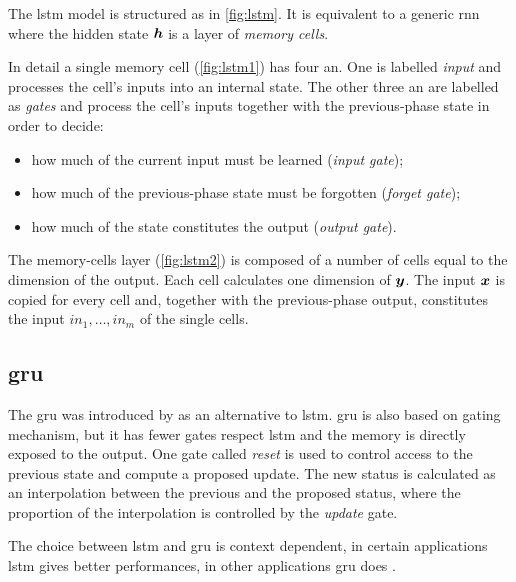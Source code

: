 The \ac{lstm} model is structured as in \cref{fig:lstm}. It is
equivalent to a
generic \ac{rnn} where the hidden state $\bm{h}$ is a
layer of \emph{memory cells}.

In detail a single
memory cell (\cref{fig:lstm1}) has four \acf{an}. One is labelled \emph{input}
and processes the cell's 
inputs into an internal state. The other three \ac{an} are labelled as
\emph{gates} and process the cell's inputs together with the previous-phase
state in order to decide:
\begin{itemize}
\item how much of the current input must be learned
  (\emph{input gate});
\item how much of the previous-phase state must be forgotten
  (\emph{forget gate});
\item how much of the state constitutes the output (\emph{output gate}).
\end{itemize}

The memory-cells layer (\cref{fig:lstm2}) is composed of a number of
cells equal to the dimension of the output. Each cell
calculates one dimension of $\bm{y}$. The input $\bm{x}$ is copied
for every cell and, together with the previous-phase
output,
constitutes the input $in_1,\dots,in_m$ of the single cells.

\subsection{\acf{gru}}
The \ac{gru} was introduced by \cite{cho2014learning} as an
alternative to \ac{lstm}. \ac{gru} is also based on gating mechanism,
but it has fewer gates respect \ac{lstm} and the memory is directly
exposed to the output. One gate called \emph{reset} is used to control
access to the previous state and compute a proposed update. The new
status is calculated as an interpolation between the previous and the
proposed status, where the proportion of the interpolation is
controlled by the \emph{update} gate.

The choice between \ac{lstm} and \ac{gru} is context dependent, in
certain applications \ac{lstm} gives better performances, in other
applications \ac{gru} does \cite{yin2017comparative}. 




